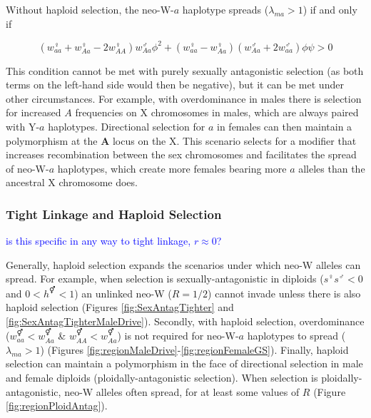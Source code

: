 \documentclass[12pt]{article}
\begin{document}
Without haploid selection, the neo-W-$a$ haplotype spreads ($\lambda_{ma}>1$) if and only if

\begin{equation}\label{eq:BeqWaspread}
(w_{aa}^\female + w_{Aa}^\female-2w_{AA}^\female)w_{Aa}^\male \phi^2 + (w_{aa}^\female-w_{Aa}^\female)(w_{Aa}^\male+2w_{aa}^\male) \phi \psi >0
\end{equation}

\noindent
This condition cannot be met with purely sexually antagonistic selection (as both terms on the left-hand side would then be negative), but it can be met under other circumstances. 
For example, with overdominance in males there is selection for increased $A$ frequencies on X chromosomes in males, which are always paired with Y-$a$ haplotypes.
Directional selection for $a$ in females can then maintain a polymorphism at the $\textbf{A}$ locus on the X.
This scenario selects for a modifier that increases recombination between the sex chromosomes \citep[e.g., blue region of Figure 2d in][]{Otto2014} and facilitates the spread of neo-W-$a$ haplotypes, which create more females bearing more $a$ alleles than the ancestral X chromosome does. 

\subsubsection*{Tight Linkage and Haploid Selection}

\textcolor{blue}{is this specific in any way to tight linkage, $r\approx0$?}

Generally, haploid selection expands the scenarios under which neo-W alleles can spread. 
For example, when selection is sexually-antagonistic in diploids ($s^\female s^\male <0$ and $0<h^\Hermaphrodite<1$) an unlinked neo-W ($R=1/2$) cannot invade unless there is also haploid selection (Figures \ref{fig:SexAntagTighter} and \ref{fig:SexAntagTighterMaleDrive}). 
Secondly, with haploid selection, overdominance ($w_{aa}^\Hermaphrodite<w_{Aa}^\Hermaphrodite$ \& $w_{AA}^\Hermaphrodite<w_{Aa}^\Hermaphrodite$) is not required for neo-W-$a$ haplotypes to spread ($\lambda_{ma}>1$) (Figures \ref{fig:regionMaleDrive}-\ref{fig:regionFemaleGS}). 
Finally, haploid selection can maintain a polymorphism in the face of directional selection in male and female diploids (ploidally-antagonistic selection). 
When selection is ploidally-antagonistic, neo-W alleles often spread, for at least some values of $R$ (Figure \ref{fig:regionPloidAntag}). 
\end{document}
